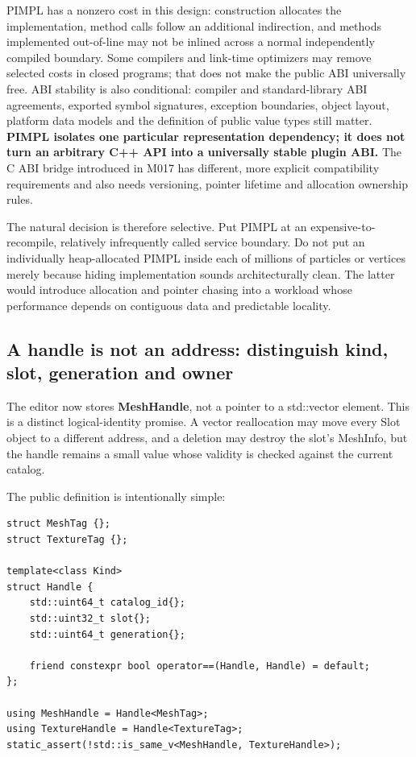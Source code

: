 PIMPL has a nonzero cost in this design: construction allocates the implementation, method calls follow an additional indirection, and methods implemented out-of-line may not be inlined across a normal independently compiled boundary. Some compilers and link-time optimizers may remove selected costs in closed programs; that does not make the public ABI universally free. ABI stability is also conditional: compiler and standard-library ABI agreements, exported symbol signatures, exception boundaries, object layout, platform data models and the definition of public value types still matter. \textbf{PIMPL isolates one particular representation dependency; it does not turn an arbitrary C++ API into a universally stable plugin ABI.} The C ABI bridge introduced in M017 has different, more explicit compatibility requirements and also needs versioning, pointer lifetime and allocation ownership rules.

The natural decision is therefore selective. Put PIMPL at an expensive-to-recompile, relatively infrequently called service boundary. Do not put an individually heap-allocated PIMPL inside each of millions of particles or vertices merely because hiding implementation sounds architecturally clean. The latter would introduce allocation and pointer chasing into a workload whose performance depends on contiguous data and predictable locality.

\subsection{A handle is not an address: distinguish kind, slot, generation and owner}\label{05-engine-i-ch007-a-handle-is-not-an-address-distinguish-kind-slot-generation-and-owner}

The editor now stores \textbf{MeshHandle}, not a pointer to a std::vector element. This is a distinct logical-identity promise. A vector reallocation may move every Slot object to a different address, and a deletion may destroy the slot's MeshInfo, but the handle remains a small value whose validity is checked against the current catalog.

The public definition is intentionally simple:

\begin{verbatim}
struct MeshTag {};
struct TextureTag {};

template<class Kind>
struct Handle {
    std::uint64_t catalog_id{};
    std::uint32_t slot{};
    std::uint64_t generation{};

    friend constexpr bool operator==(Handle, Handle) = default;
};

using MeshHandle = Handle<MeshTag>;
using TextureHandle = Handle<TextureTag>;
static_assert(!std::is_same_v<MeshHandle, TextureHandle>);
\end{verbatim}

